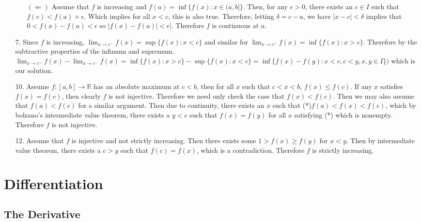 \documentclass[letter paper, 11pt]{article}
\begin{document}
\begin{itemize}
\begin{itemize}
        \item[$(\Leftarrow)$] Assume that $f$ is increasing and $f(a)=\inf\{f(x):x\in(a,b]\}$. Then, for any $\epsilon>0$, there exists an $c\in I$ such that $f(c)<f(a)+\epsilon$. Which implies for all $x<c$, this is also true. Therefore, letting $\delta=c-a$, we have $|x-c|<\delta$ implies that $0<f(x)-f(a)<\epsilon$ so $|f(x)-f(a)|<\epsilon|$. Therefore $f$ is continuous at $a$.
        
    \end{itemize}
    
    \item[7.] Since $f$ is increasing, $\lim_{x\rightarrow c^-}f(x)=\sup\{f(x):x<c\}$ and similar for $\lim_{x\rightarrow c^+}f(x)=\inf\{f(x):x>c\}$. Therefore by the subtractive properties of the infimum and supremum. $\lim_{x\rightarrow c^+}f(x)-\lim_{x\rightarrow c^-}f(x) = \inf\{f(x):x>c\}- \sup\{f(x):x<c\} = \inf\{f(x)-f(y):x<c,c<y,x,y\in I\})$ which is our solution.
    
    \item[10.] Assume $f:[a,b]\rightarrow\mathbb{R}$ has an absolute maximum at $c<b$, then for all $x$ such that $c<x<b$, $f(x)\leq f(c)$. If any $x$ satisfies $f(x)=f(c)$, then clearly $f$ is not injective. Therefore we need only check the case that $f(x) < f(c)$. Then we may also assume that $f(a)<f(c)$ for a similar argument. Then due to continuity, there exists an $x$ such that (*)$f(a)<f(x)<f(c)$, which by bolzano's intermediate value theorem, there exists a $y<c$ such that $f(x)=f(y)$ for all $x$ satisfying (*) which is nonempty. Therefore $f$ is not injective.
    
    \item[12.] Assume that $f$ is injective and not strictly increasing. Then there exists some $1>f(x)\geq f(y)$ for $x<y$. Then by intermediate value theorem, there exists a $c>y$ such that $f(c)=f(x)$, which is a contradiction. Therefore $f$ is strictly increasing.
     
\end{itemize}

\section{Differentiation}

\subsection{The Derivative}
\end{document}
